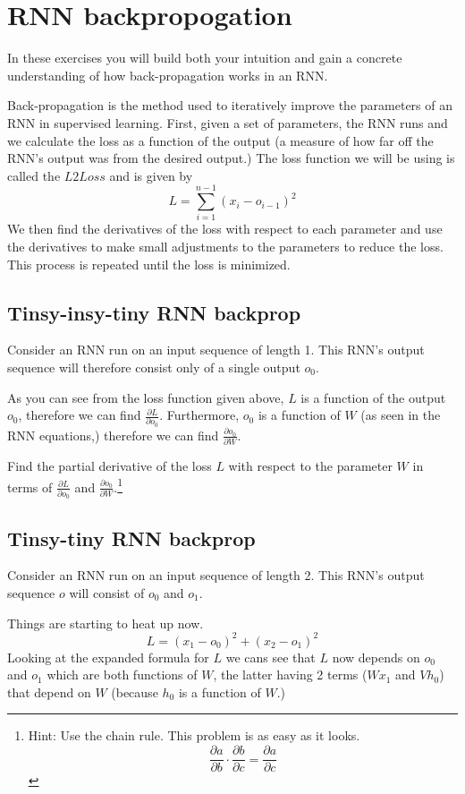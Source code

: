 \documentclass{article}
\begin{document}
\section{RNN backpropogation}
In these exercises you will build both your intuition and gain a concrete understanding of how back-propagation works in an RNN.

Back-propagation is the method used to iteratively improve the parameters of an RNN in supervised learning. First, given a set of parameters, the RNN runs and we calculate the loss as a function of the output (a measure of how far off the RNN's output was from the desired output.) The loss function we will be using is called the $L2Loss$ and is given by
$$ L = \sum_{i = 1}^{n - 1} (x_{i} - o_{i - 1})^2 $$
We then find the derivatives of the loss with respect to each parameter and use the derivatives to make small adjustments to the parameters to reduce the loss. This process is repeated until the loss is minimized.

\subsection{Tinsy-insy-tiny RNN backprop}
Consider an RNN run on an input sequence of length 1. This RNN's output sequence will therefore consist only of a single output $o_0$.

As you can see from the loss function given above, $L$ is a function of the output $o_0$, therefore we can find $\frac{\partial L}{\partial o_0}$. Furthermore, $o_0$ is a function of $W$ (as seen in the RNN equations,) therefore we can find $\frac{\partial o_0}{\partial W}$.

Find the partial derivative of the loss $L$ with respect to the parameter $W$ in terms of $\frac{\partial L}{\partial o_0}$ and $\frac{\partial o_0}{\partial W}$.\footnote{Hint: Use the chain rule. This problem is as easy as it looks.
$$ \frac{\partial a}{\partial b} \cdot \frac{\partial b}{\partial c} = \frac{\partial a}{\partial c} $$}

\subsection{Tinsy-tiny RNN backprop}
Consider an RNN run on an input sequence of length 2. This RNN's output sequence $o$ will consist of $o_0$ and $o_1$.

Things are starting to heat up now.
$$ L = (x_1 - o_0)^2 + (x_2 - o_1)^2 $$
Looking at the expanded formula for $L$ we cans see that $L$ now depends on $o_0$ and $o_1$ which are both functions of $W$, the latter having 2 terms ($Wx_1$ and $Vh_0$) that depend on $W$ (because $h_0$ is a function of $W$.)
\end{document}
